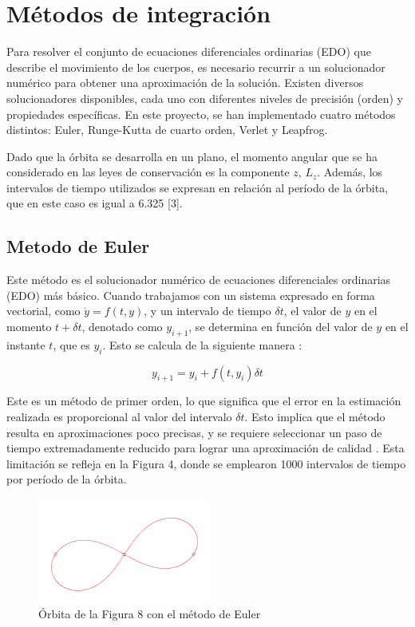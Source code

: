 \documentclass{article}
\begin{document}
\section{Métodos de integración}
Para resolver el conjunto de ecuaciones diferenciales 
ordinarias (EDO) que describe el movimiento de 
los cuerpos, es necesario recurrir a un solucionador 
numérico para obtener una aproximación de la solución. 
Existen diversos solucionadores disponibles, cada 
uno con diferentes niveles de precisión (orden) y 
propiedades específicas. En este proyecto, se han 
implementado cuatro métodos distintos: 
Euler, Runge-Kutta de cuarto orden, Verlet y Leapfrog.

Dado que la órbita se desarrolla en un plano, el 
momento angular que se ha considerado en las 
leyes de conservación es la componente $z$, $L_z$. 
Además, los intervalos de tiempo utilizados 
se expresan en relación al período de la órbita, 
que en este caso es igual a 6.325 [3].

\subsection{Metodo de Euler}
Este método es el solucionador numérico de ecuaciones 
diferenciales ordinarias (EDO) más básico. Cuando 
trabajamos con un sistema expresado en forma 
vectorial, como $\dot{y} = f(t, y)$, y un intervalo 
de tiempo $\delta t$, el valor de $y$ en el momento $ t + \delta t$, 
denotado como $y_{i+1}$, se determina en función del 
valor de $y$ en el instante $t$, que es $y_i$. 
Esto se calcula de la siguiente manera \cite{atkinson2011numerical}:

\begin{equation}
    y_{i+1} = y_i + f(t, y_i) \delta t
\end{equation}

Este es un método de primer orden, lo que significa 
que el error en la estimación realizada es proporcional 
al valor del intervalo $\delta t$. Esto implica que el método 
resulta en aproximaciones poco precisas, y se requiere 
seleccionar un paso de tiempo extremadamente reducido 
para lograr una aproximación de calidad \cite{atkinson2011numerical}. 
Esta limitación se refleja en la Figura 4, donde 
se emplearon 1000 intervalos de tiempo por 
período de la órbita.


\begin{figure}[h]
\centering
\includegraphics[width=0.5\textwidth]{img/orbit8.png}
\caption{Órbita de la Figura 8 con el método de Euler}
\end{figure}




\printbibliography
\end{document}
